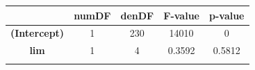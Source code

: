 \documentclass[]{article}
\begin{document}
\begin{longtable}[]{@{}ccccc@{}}
\toprule
\begin{minipage}[b]{0.21\columnwidth}\centering\strut
~
\strut\end{minipage} &
\begin{minipage}[b]{0.10\columnwidth}\centering\strut
numDF
\strut\end{minipage} &
\begin{minipage}[b]{0.10\columnwidth}\centering\strut
denDF
\strut\end{minipage} &
\begin{minipage}[b]{0.12\columnwidth}\centering\strut
F-value
\strut\end{minipage} &
\begin{minipage}[b]{0.12\columnwidth}\centering\strut
p-value
\strut\end{minipage}\tabularnewline
\midrule
\endhead
\begin{minipage}[t]{0.21\columnwidth}\centering\strut
\textbf{(Intercept)}
\strut\end{minipage} &
\begin{minipage}[t]{0.10\columnwidth}\centering\strut
1
\strut\end{minipage} &
\begin{minipage}[t]{0.10\columnwidth}\centering\strut
230
\strut\end{minipage} &
\begin{minipage}[t]{0.12\columnwidth}\centering\strut
14010
\strut\end{minipage} &
\begin{minipage}[t]{0.12\columnwidth}\centering\strut
0
\strut\end{minipage}\tabularnewline
\begin{minipage}[t]{0.21\columnwidth}\centering\strut
\textbf{lim}
\strut\end{minipage} &
\begin{minipage}[t]{0.10\columnwidth}\centering\strut
1
\strut\end{minipage} &
\begin{minipage}[t]{0.10\columnwidth}\centering\strut
4
\strut\end{minipage} &
\begin{minipage}[t]{0.12\columnwidth}\centering\strut
0.3592
\strut\end{minipage} &
\begin{minipage}[t]{0.12\columnwidth}\centering\strut
0.5812
\strut\end{minipage}\tabularnewline
\begin{minipage}[t]{0.21\columnwidth}\centering\strut

\end{minipage}
\end{longtable}
\end{document}
